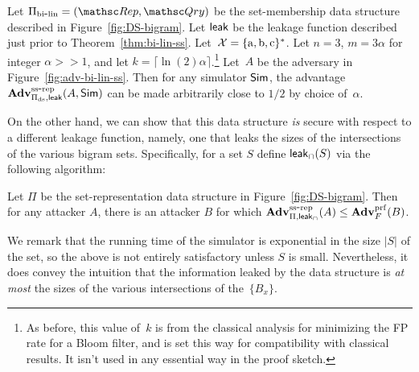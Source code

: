 \begin{theorem}\label{thm:bi-ds-ss}
Let $\setprim_{\bilin}= (\Rep, \Qry)$ be the set-membership data
structure described in Figure~\ref{fig:DS-bigram}. Let ${\sf leak}$ be
the leakage function described just prior to
Theorem~\ref{thm:bi-lin-ss}. Let~${\cal X}=\{\mathrm{a,b,c}\}^*$. Let
$n=3$,  $m=3\alpha $ for integer $\alpha >> 1$, and let $k = \lceil
\ln(2) \alpha \rceil$.\footnote{As before, this value of~$k$ is from the
classical analysis for minimizing the FP rate for a Bloom filter,
and is set this way for compatibility with classical results.  It
isn't used in any essential way in the proof sketch.}  Let~$A$ be
the adversary in Figure~\ref{fig:adv-bi-lin-ss}.  Then for any
simulator ${\sf Sim}$, the advantage
$\mathrm{\mathbf{Adv}}^{\mathrm{ss\mbox{-}rep}}_{\Pi_{\mathrm{ds}},{\sf leak}}(A,{\sf Sim})$ can be made
arbitrarily close to $1/2$ by choice of~$\alpha$.
\end{theorem}

On the other hand, we can show that this data structure \emph{is}
secure with respect to a different leakage function, namely, one
that leaks the sizes of the intersections of the various bigram
sets. Specifically, for a set $S$ define ${\sf leak}_\cap(S)$ via
the following algorithm:

\begin{figure}[h]
\centering
{}
\end{figure}

\begin{theorem} \label{thm:bi-ds-prf-priv-ss}
Let $\Pi$ be the set-representation data structure in
Figure~\ref{fig:DS-bigram}. Then for any attacker $A$, there is an
attacker $B$
for which
$\mathrm{\mathbf{Adv}}^{\mathrm{ss\mbox{-}rep}}_{\Pi,{\sf leak}_\cap}(A) \leq \mathbf{Adv}^{\mathrm{prf}}_{F}(B)$.
\end{theorem}

We remark that the running time of the simulator is exponential in
the size $|S|$ of the set, so the above is not entirely satisfactory
unless $S$ is small. Nevertheless, it does convey the intuition that
the information leaked by the data structure is \emph{at most} the
sizes of the various intersections of the~$\{B_x\}$.

